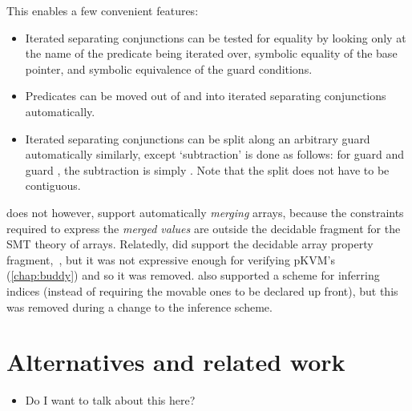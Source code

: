 This enables a few convenient features:
\begin{itemize}
    \item Iterated separating conjunctions can be tested for equality by
        looking only at the name of the predicate being iterated over, symbolic
        equality of the base pointer, and symbolic equivalence of the guard
        conditions.
    \item Predicates can be moved out of and into iterated separating conjunctions
        automatically.
    \item Iterated separating conjunctions can be split along an arbitrary
        guard automatically similarly, except `subtraction' is done as follows:
        for guard  and guard
        , %
        the subtraction is simply . Note that the split %
        does not have to be contiguous.
\end{itemize}

 does not however, support automatically \emph{merging} arrays, because
the constraints required to express the \emph{merged values} are outside the
decidable fragment for the SMT theory of arrays. Relatedly,  did
support the decidable array property fragment,~, but
it was not expressive enough for verifying pKVM's 
(\cref{chap:buddy}) and so it was removed.  also supported a scheme for
inferring indices (instead of requiring the movable ones to be declared up
front), but this was removed during a change to the inference
scheme.\label{sn:new-inf}

\section{Alternatives and related work}

\begin{itemize}
    \item Do I want to talk about this here?
\end{itemize}

